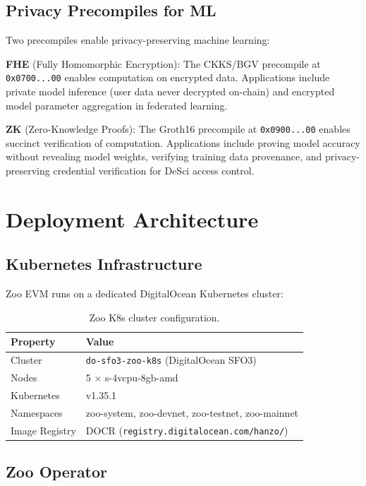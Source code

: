 \documentclass[11pt,a4paper]{article}
\begin{document}
\subsection{Privacy Precompiles for ML}

Two precompiles enable privacy-preserving machine learning:

\textbf{FHE} (Fully Homomorphic Encryption): The CKKS/BGV precompile at \texttt{0x0700...00} enables computation on encrypted data. Applications include private model inference (user data never decrypted on-chain) and encrypted model parameter aggregation in federated learning.

\textbf{ZK} (Zero-Knowledge Proofs): The Groth16 precompile at \texttt{0x0900...00} enables succinct verification of computation. Applications include proving model accuracy without revealing model weights, verifying training data provenance, and privacy-preserving credential verification for DeSci access control.

\section{Deployment Architecture}

\subsection{Kubernetes Infrastructure}

Zoo EVM runs on a dedicated DigitalOcean Kubernetes cluster:

\begin{table}[h]
\centering
\begin{tabular}{ll}
\toprule
\textbf{Property} & \textbf{Value} \\
\midrule
Cluster & \texttt{do-sfo3-zoo-k8s} (DigitalOcean SFO3) \\
Nodes & 5 $\times$ s-4vcpu-8gb-amd \\
Kubernetes & v1.35.1 \\
Namespaces & zoo-system, zoo-devnet, zoo-testnet, zoo-mainnet \\
Image Registry & DOCR (\texttt{registry.digitalocean.com/hanzo/}) \\
\bottomrule
\end{tabular}
\caption{Zoo K8s cluster configuration.}
\end{table}

\subsection{Zoo Operator}
\end{document}
